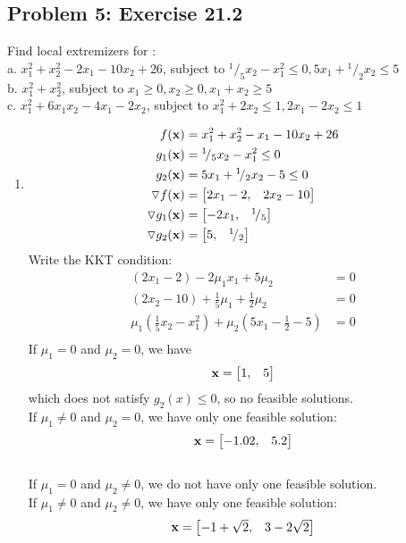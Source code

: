 \documentclass{article}
\newcommand*\rfrac[2]{{}^{#1}\!/_{#2}}
\begin{document}
\hypertarget{}{}
\subsection*{{Problem 5: Exercise 21.2}}
\label{}
Find local extremizers for : \\
a. $x_1^2 + x_2^2 -2x_1 - 10x_2 + 26 $,  subject to $\rfrac{1}{5} x_2 -x_1^2 \leq 0, 5x_1+\rfrac{1}{2}x_2\leq5$ \\
b. $x_1^2 +x_2^2 $, subject to $x_1 \geq0, x_2\geq0, x_1+x_2\geq 5$ \\
c. $x_1^2 +6x_1x_2 -4x_1 -2x_2 $,  subject to $x_1^2 +2x_2\leq1, 2x_1-2x_2 \leq 1$ 

\begin{enumerate} [label=(\alph*)] 

\item 
\begin{align*} 
f(\vx) & = x_1^2 + x_2^2 -x_1 - 10x_2 + 26 \\
g_1 (\vx)  &=  \rfrac{1}{5} x_2 -x_1^2  \leq 0 \\
g_2(\vx) & =  5x_1+\rfrac{1}{2}x_2 - 5 \leq 0 \\
\triangledown f(\vx) &= \bmat{2x_1 - 2,  & 2x_2-10} \\
\triangledown g_1(\vx) &= \bmat{-2x_1, & \rfrac{1}{5} } \\
\triangledown g_2(\vx) &= \bmat{ 5, & \rfrac{1}{2}} 
\end{align*} 
Write the KKT condition: 
\begin{align*} 
(2x_1-2) -2 \mu_1 x_1  + 5\mu_2 &= 0 \\
(2x_2-10) +\frac{1}{5}\mu_1 + \frac{1}{2} \mu_2 & = 0 \\
\mu_1 (\frac{1}{5}x_2 -x_1^2 ) + \mu_2(5x_1-\frac{1}{2} - 5) & = 0 \\
\end{align*} 
If  $\mu_1 = 0  $ and $\mu_2  = 0 $, we have \begin{align*} \boldsymbol{\mathrm{x}} = \begin{bmatrix} 1, & 5 \end{bmatrix} \end{align*} which does not satisfy $g_2(x) \leq 0 $, so no feasible solutions.  \\
If  $\mu_1 \neq 0  $ and $\mu_2  = 0 $, we have only one feasible solution:  \begin{align*} \boldsymbol{\mathrm{x}} = \begin{bmatrix} -1.02, & 5.2 \end{bmatrix} \end{align*}  \\
If  $\mu_1 = 0  $ and $\mu_2  \neq 0 $, we do not have only one feasible solution. \\
If  $\mu_1 \neq 0  $ and $\mu_2 \neq 0 $, we have only one feasible solution:  \begin{align*} \boldsymbol{\mathrm{x}} = \begin{bmatrix} -1+\sqrt{2},  & 3-2\sqrt{2} \end{bmatrix} \end{align*}  \\


\end{enumerate}
\end{document}

